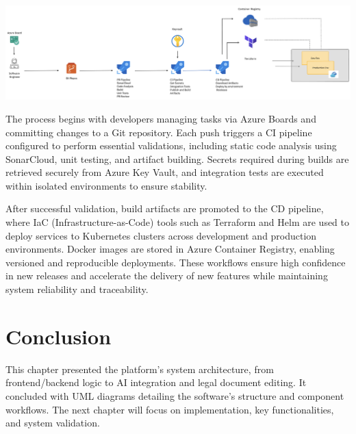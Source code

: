 \begin{center}
    \centering
    \includegraphics[width=1\textwidth]{Images/Deployment Architecture.png}
    \label{fig:deployment_architecture}
\end{center}

The process begins with developers managing tasks via Azure Boards and committing changes to a Git repository. Each push triggers a CI pipeline configured to perform essential validations, including static code analysis using SonarCloud, unit testing, and artifact building. Secrets required during builds are retrieved securely from Azure Key Vault, and integration tests are executed within isolated environments to ensure stability.\mynewline

After successful validation, build artifacts are promoted to the CD pipeline, where IaC (Infrastructure-as-Code) tools such as Terraform and Helm are used to deploy services to Kubernetes clusters across development and production environments. Docker images are stored in Azure Container Registry, enabling versioned and reproducible deployments. These workflows ensure high confidence in new releases and accelerate the delivery of new features while maintaining system reliability and traceability.

\section{Conclusion}
This chapter presented the platform’s system architecture, from frontend/backend logic to AI integration and legal document editing. It concluded with UML diagrams detailing the software’s structure and component workflows. The next chapter will focus on implementation, key functionalities, and system validation.